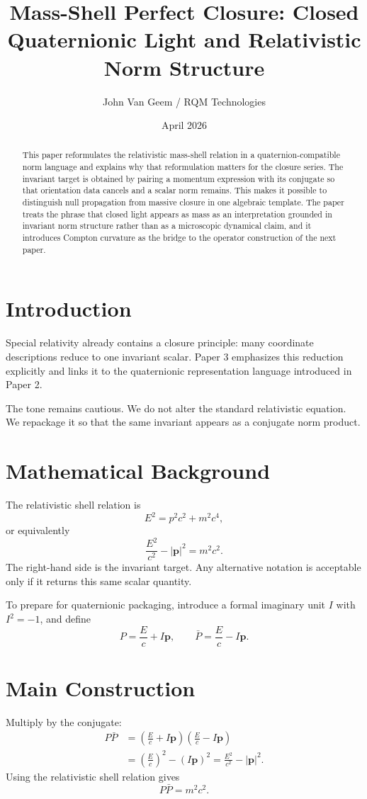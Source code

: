 \documentclass[11pt]{article}
\title{Mass-Shell Perfect Closure: Closed Quaternionic Light and Relativistic Norm Structure}
\author{John Van Geem / RQM Technologies}
\date{April 2026}
\begin{document}
\maketitle

\begin{abstract}
This paper reformulates the relativistic mass-shell relation in a quaternion-compatible norm language and explains why that reformulation matters for the closure series. The invariant target is obtained by pairing a momentum expression with its conjugate so that orientation data cancels and a scalar norm remains. This makes it possible to distinguish null propagation from massive closure in one algebraic template. The paper treats the phrase that closed light appears as mass as an interpretation grounded in invariant norm structure rather than as a microscopic dynamical claim, and it introduces Compton curvature as the bridge to the operator construction of the next paper.
\end{abstract}

\section{Introduction}
Special relativity already contains a closure principle: many coordinate descriptions reduce to one invariant scalar. Paper 3 emphasizes this reduction explicitly and links it to the quaternionic representation language introduced in Paper 2.

The tone remains cautious. We do not alter the standard relativistic equation. We repackage it so that the same invariant appears as a conjugate norm product.

\section{Mathematical Background}
The relativistic shell relation is
\[
E^2=p^2c^2+m^2c^4,
\]
or equivalently
\[
\frac{E^2}{c^2}-|\mathbf p|^2=m^2c^2.
\]
The right-hand side is the invariant target. Any alternative notation is acceptable only if it returns this same scalar quantity.

To prepare for quaternionic packaging, introduce a formal imaginary unit $I$ with $I^2=-1$, and define
\[
P=\frac{E}{c}+I\mathbf p,
\qquad
\bar P=\frac{E}{c}-I\mathbf p.
\]

\section{Main Construction}
Multiply by the conjugate:
\[
\begin{aligned}
P\bar P
&=\left(\frac{E}{c}+I\mathbf p\right)\left(\frac{E}{c}-I\mathbf p\right)\\
&=\left(\frac{E}{c}\right)^2-(I\mathbf p)^2
=\frac{E^2}{c^2}-|\mathbf p|^2.
\end{aligned}
\]
Using the relativistic shell relation gives
\[
P\bar P=m^2c^2.
\]
\end{document}
